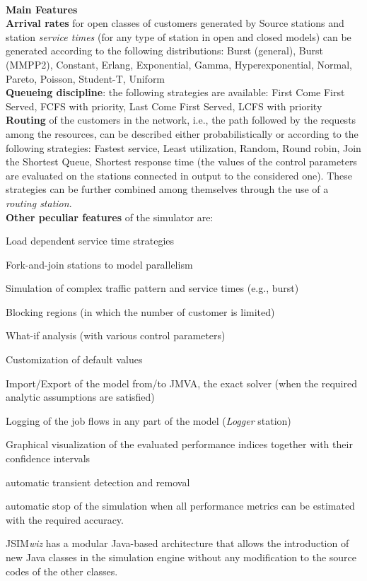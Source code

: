 \ \\
\noindent \textbf{\large Main Features}\\
\noindent \textbf{Arrival rates} for open classes of customers
generated by Source stations and station \emph{service times} (for
any type of station in open and closed models) can be generated
according to the following distributions: Burst (general), Burst (MMPP2),
Constant, Erlang, Exponential, Gamma, Hyperexponential, Normal,
Pareto, Poisson, Student-T, Uniform \\

\noindent \textbf{Queueing discipline}: the following strategies
are available:  First Come First Served, FCFS with priority, Last
Come First Served, LCFS with priority\\

\noindent \textbf{Routing} of the customers in the network, i.e.,
the path followed by the requests among the resources, can be
described either probabilistically or according to the following
strategies: Fastest service, Least utilization, Random, Round
robin, Join the Shortest Queue, Shortest response time (the values
of the control parameters are evaluated on the stations connected
in output to the considered one). These strategies can be further
combined among themselves through the use of a \emph{routing
station}.\\

\noindent \textbf{Other peculiar features} of the simulator are:
\vspace{-0.2cm}
\begin{itemize*}
    \item Load dependent service time strategies
    \item Fork-and-join stations to model parallelism
    \item Simulation of complex traffic pattern and service times (e.g., burst)
    \item Blocking regions (in which the number of customer is limited)
    \item What-if analysis (with various control parameters)
    \item Customization of default values
    \item Import/Export of the model from/to JMVA, the exact solver (when
    the required analytic assumptions are satisfied)
    \item Logging of the job flows in any part of the model
    (\emph{Logger} station)
    \item Graphical visualization of the evaluated performance
    indices together with their confidence intervals
    \item automatic transient detection and removal
    \item automatic stop of the simulation when all performance
    metrics can be estimated with the required accuracy.
\end{itemize*}
JSIM\emph{wiz} has a modular Java-based architecture that allows
the introduction of new Java classes in the simulation engine
without any modification to the source codes of the other classes.


